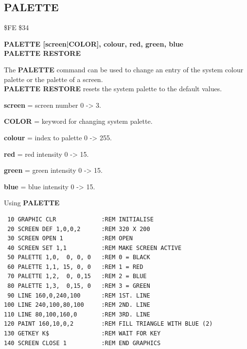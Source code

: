 \subsection{PALETTE}
\begin{description}[leftmargin=2cm,style=nextline]
\item [Token:] \$FE \$34
\item [Format:] {\bf PALETTE [screen|COLOR], colour, red, green, blue} \\
                {\bf PALETTE RESTORE}
\item [Usage:]  The {\bf PALETTE} command can be used to change an
                entry of the system colour palette or the palette
                of a screen. \\
                {\bf PALETTE RESTORE} resets the system palette to
                the default values.

                {\bf screen} = screen number 0 -> 3.

                {\bf COLOR} = keyword for changing system palette.

                {\bf colour} = index to palette 0 -> 255.

                {\bf red} = red intensity 0 -> 15.

                {\bf green} = green intensity 0 -> 15.

                {\bf blue} = blue intensity 0 -> 15.

\item [Example:] Using {\bf PALETTE}

\begin{tcolorbox}[colback=black,coltext=white]
\verbatimfont{\codefont}
\begin{verbatim}
 10 GRAPHIC CLR             :REM INITIALISE
 20 SCREEN DEF 1,0,0,2      :REM 320 X 200
 30 SCREEN OPEN 1           :REM OPEN
 40 SCREEN SET 1,1          :REM MAKE SCREEN ACTIVE
 50 PALETTE 1,0,  0, 0, 0   :REM 0 = BLACK
 60 PALETTE 1,1, 15, 0, 0   :REM 1 = RED
 70 PALETTE 1,2,  0, 0,15   :REM 2 = BLUE
 80 PALETTE 1,3,  0,15, 0   :REM 3 = GREEN
 90 LINE 160,0,240,100      :REM 1ST. LINE
100 LINE 240,100,80,100     :REM 2ND. LINE
110 LINE 80,100,160,0       :REM 3RD. LINE
120 PAINT 160,10,0,2        :REM FILL TRIANGLE WITH BLUE (2)
130 GETKEY K$               :REM WAIT FOR KEY
140 SCREEN CLOSE 1          :REM END GRAPHICS
\end{verbatim}
\end{tcolorbox}
\end{description}


